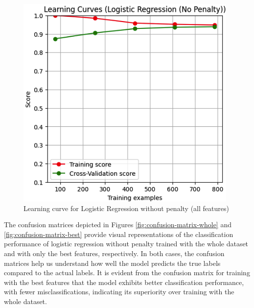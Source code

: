 \documentclass[conference]{IEEEtran}
\begin{document}
\begin{figure}[H]
    \centering
    \includegraphics[width=1\linewidth]{images/LearningcurveNoPenaltyWholeDat.png}
    \caption{Learning curve for Logistic Regression without penalty (all features)}
    \label{fig:learning-curve-whole}
\end{figure}

The confusion matrices depicted in Figures \ref{fig:confusion-matrix-whole} and \ref{fig:confusion-matrix-best} provide visual representations of the classification performance of logistic regression without penalty trained with the whole dataset and with only the best features, respectively. In both cases, the confusion matrices help us understand how well the model predicts the true labels compared to the actual labels. It is evident from the confusion matrix for training with the best features that the model exhibits better classification performance, with fewer misclassifications, indicating its superiority over training with the whole dataset.
\end{document}
